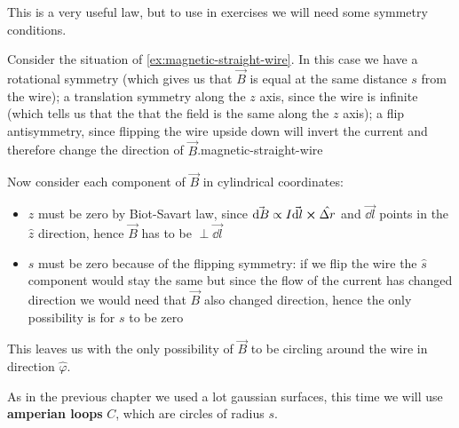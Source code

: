 \documentclass[12pt]{extarticle}
\begin{document}
This is a very useful law, but to use in exercises we will need some symmetry conditions.

Consider the situation of \cref{ex:magnetic-straight-wire}.
In this case we have a rotational symmetry (which gives us that $\vec B$ is equal at the same distance $s$ from the wire);
a translation symmetry along the $z$ axis, since the wire is infinite (which tells us that the that the field is the same along the $z$ axis);
a flip antisymmetry, since flipping the wire upside down will invert the current and therefore change the direction of $\vec B$.magnetic-straight-wire

Now consider each component of $\vec B$ in cylindrical coordinates:
\begin{itemize}
    \item
          $z$ must be zero by Biot-Savart law, since $\vec{\dd B} \propto I \vec{\dd l} \cross \hat{\Delta r}$
          and $\vec{\dd l}$ points in the $\hat z$ direction, hence $\vec B$ has to be $\perp \vec{\dd l}$
    \item
          $s$ must be zero because of the flipping symmetry: if we flip the wire the $\hat s$ component would stay the same
          but since the flow of the current has changed direction we would need that $\vec B$ also changed direction,
          hence the only possibility is for $s$ to be zero
\end{itemize}
This leaves us with the only possibility of $\vec B$ to be circling around the wire in direction $\hat \varphi$.

As in the previous chapter we used a lot gaussian surfaces, this time we will use \textbf{amperian loops} $C$,
which are circles of radius $s$.
\end{document}

